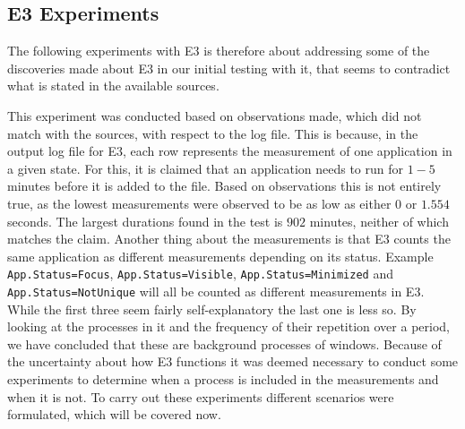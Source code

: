 \subsection{E3 Experiments}

The following experiments with E3 is therefore about addressing some of the discoveries made about E3 in our initial testing with it, that seems to contradict what is stated in the available sources\cite[]{E3Doc,E3Video,E3WinHec}. 

This experiment was conducted based on observations made, which did not match with the sources, with respect to the log file. This is because, in the output log file for E3, each row represents the measurement of one application in a given state. For this, it is claimed that an application needs to run for $1-5$ minutes before it is added to the file. Based on observations this is not entirely true, as the lowest measurements were observed to be as low as either $0$ or $1.554$ seconds. The largest durations found in the test is $902$ minutes, neither of which matches the claim. Another thing about the measurements is that E3 counts the same application as different measurements depending on its status.
Example \texttt{App.Status=Focus}, \texttt{App.Status=Visible}, \texttt{App.Status=Minimized} and \texttt{App.Status=NotUnique} will all be counted as different measurements in E3. While the first three seem fairly self-explanatory the last one is less so. By looking at the processes in it and the frequency of their repetition over a period, we have concluded that these are background processes of windows. 
Because of the uncertainty about how E3 functions it was deemed necessary to conduct some experiments to determine when a process is included in the measurements and when it is not. To carry out these experiments different scenarios were formulated, which will be covered now.

